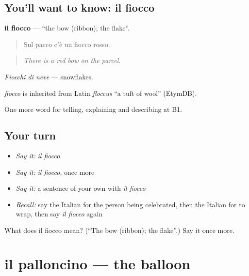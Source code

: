\subsection*{You'll want to know: il fiocco}
\textbf{il fiocco} — \textquotedblleft{}the bow (ribbon); the flake\textquotedblright{}.

\begin{quote}
Sul pacco c'è un fiocco rosso.
\end{quote}

\begin{quote}
\emph{There is a red bow on the parcel.}
\end{quote}

\emph{Fiocchi di neve} — snowflakes.

\begin{cousinweb}
\emph{fiocco} is inherited from Latin \emph{floccus} \textquotedblleft{}a tuft of wool\textquotedblright{} (EtymDB).
\end{cousinweb}

\begin{grammarlens}[title={What you've built}]
One more word for telling, explaining and describing at B1.
\end{grammarlens}

\subsection*{Your turn}
\begin{itemize}
\raggedright
  \item \emph{Say it:} \emph{il fiocco}
  \item \emph{Say it:} \emph{il fiocco}, once more
  \item \emph{Say it:} a sentence of your own with \emph{il fiocco}
  \item \emph{Recall:} say the Italian for the person being celebrated, then the Italian for to wrap, then say \emph{il fiocco} again
\end{itemize}

\begin{tcolorbox}[breakable,colback=teal!4,colframe=teal!35!black,title={Before you move on}]
What does il fiocco mean? (\textquotedblleft{}The bow (ribbon); the flake\textquotedblright{}.) Say it once more.
\end{tcolorbox}
\section[il palloncino]{il palloncino — the balloon}

